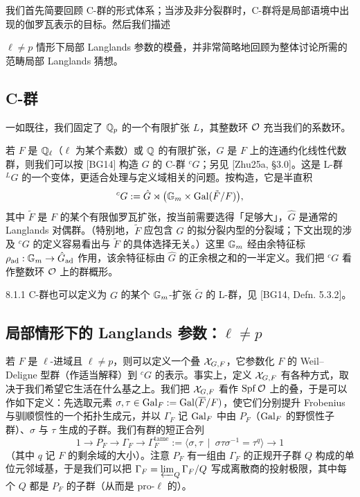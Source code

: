 我们首先简要回顾 C-群的形式体系；当涉及非分裂群时，C-群将是局部语境中出现的伽罗瓦表示的目标。然后我们描述

$\ell\neq p$ 情形下局部 Langlands 参数的模叠，并非常简略地回顾为整体讨论所需的范畴局部 Langlands 猜想。

\subsection{C-群}
一如既往，我们固定了 $\mathbb{Q}_p$ 的一个有限扩张 $L$，其整数环 $\mathcal{O}$ 充当我们的系数环。

若 $F$ 是 $\mathbb{Q}_\ell$（$\ell$ 为某个素数）或 $\mathbb{Q}$ 的有限扩张，$G$ 是 $F$ 上的连通约化线性代数群，则我们可以按 [BG14] 构造 $G$ 的 C-群 ${}^cG$；另见 [Zhu25a, §3.0]。这是 L-群 ${}^LG$ 的一个变体，更适合处理与定义域相关的问题。按构造，它是半直积
\[
{}^cG:=\hat G\rtimes\bigl(\mathbb{G}_m\times\operatorname{Gal}(\tilde F/F)\bigr),
\]
其中 $\tilde F$ 是 $F$ 的某个有限伽罗瓦扩张，按当前需要选得「足够大」，$\hat G$ 是通常的 Langlands 对偶群。（特别地，$\tilde F$ 应包含 $G$ 的拟分裂内型的分裂域；下文出现的涉及 ${}^cG$ 的定义容易看出与 $\tilde F$ 的具体选择无关。）这里 $\mathbb{G}_m$ 经由余特征标 $\rho_{\mathrm{ad}}:\mathbb{G}_m\to\hat G_{\mathrm{ad}}$ 作用，该余特征标由 $\hat G$ 的正余根之和的一半定义。我们把 ${}^cG$ 看作整数环 $\mathcal{O}$ 上的群概形。

\begin{rem}{8.1.1}\label{rem:a4-8-1-1}
C-群也可以定义为 $G$ 的某个 $\mathbb{G}_m$-扩张 $\tilde G$ 的 L-群，见 [BG14, Defn. 5.3.2]。
\end{rem}

\subsection{局部情形下的 Langlands 参数：$\ell\neq p$}
若 $F$ 是 $\ell$-进域且 $\ell\neq p$，则可以定义一个叠 $\mathcal{X}_{G,F}$，它参数化 $F$ 的 Weil--Deligne 型群（作适当解释）到 ${}^cG$ 的表示。事实上，定义 $\mathcal{X}_{G,F}$ 有各种方式，取决于我们希望它生活在什么基之上。我们把 $\mathcal{X}_{G,F}$ 看作 $\operatorname{Spf}\mathcal{O}$ 上的叠，于是可以作如下定义：先选取元素 $\sigma,\tau\in\operatorname{Gal}_F:=\operatorname{Gal}(\overline{F}/F)$，使它们分别提升 Frobenius 与驯顺惯性的一个拓扑生成元，并以 $\Gamma_F$ 记 $\operatorname{Gal}_F$ 中由 $P_F$（$\operatorname{Gal}_F$ 的野惯性子群）、$\sigma$ 与 $\tau$ 生成的子群。我们有群的短正合列
\[
1\to P_F\to\Gamma_F\to\Gamma^{\mathrm{tame}}_F:=\langle\sigma,\tau\ \mid\ \sigma\tau\sigma^{-1}=\tau^q\rangle\to1
\]
（其中 $q$ 记 $F$ 的剩余域的大小）。注意 $P_F$ 有一组由 $\Gamma_F$ 的正规开子群 $Q$ 构成的单位元邻域基，于是我们可以把 $\Gamma_F=\varprojlim_Q\Gamma_F/Q$ 写成离散商的投射极限，其中每个 $Q$ 都是 $P_F$ 的子群（从而是 pro-$\ell$ 的）。

